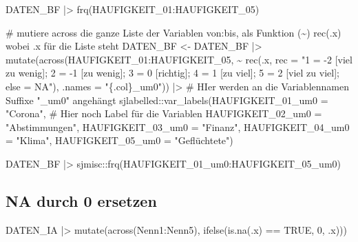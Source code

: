 \documentclass[twoside, pagesize, fontsize=11pt, dvipsnames]{scrreport}
\newenvironment{Shaded}{\begin{snugshade}}{\end{snugshade}}
\newcommand{\AttributeTok}[1]{\textcolor[rgb]{0.40,0.45,0.13}{#1}}
\newcommand{\CommentTok}[1]{\textcolor[rgb]{0.37,0.37,0.37}{#1}}
\newcommand{\ConstantTok}[1]{\textcolor[rgb]{0.56,0.35,0.01}{#1}}
\newcommand{\DecValTok}[1]{\textcolor[rgb]{0.68,0.00,0.00}{#1}}
\newcommand{\ErrorTok}[1]{\textcolor[rgb]{0.68,0.00,0.00}{#1}}
\newcommand{\FunctionTok}[1]{\textcolor[rgb]{0.28,0.35,0.67}{#1}}
\newcommand{\NormalTok}[1]{\textcolor[rgb]{0.00,0.23,0.31}{#1}}
\newcommand{\OtherTok}[1]{\textcolor[rgb]{0.00,0.23,0.31}{#1}}
\newcommand{\SpecialCharTok}[1]{\textcolor[rgb]{0.37,0.37,0.37}{#1}}
\newcommand{\StringTok}[1]{\textcolor[rgb]{0.13,0.47,0.30}{#1}}
\begin{document}
\begin{Shaded}
\begin{Highlighting}[]
\NormalTok{DATEN\_BF }\SpecialCharTok{|\textgreater{}} 
  \FunctionTok{frq}\NormalTok{(HAUFIGKEIT\_01}\SpecialCharTok{:}\NormalTok{HAUFIGKEIT\_05)}

\CommentTok{\# mutiere across die ganze Liste der Variablen von:bis, als Funktion (\textasciitilde{}) rec(.x) wobei .x für die Liste steht}
\NormalTok{DATEN\_BF }\OtherTok{\textless{}{-}}\NormalTok{ DATEN\_BF }\SpecialCharTok{|\textgreater{}} 
  \FunctionTok{mutate}\NormalTok{(}\FunctionTok{across}\NormalTok{(HAUFIGKEIT\_01}\SpecialCharTok{:}\NormalTok{HAUFIGKEIT\_05, }
                \SpecialCharTok{\textasciitilde{}} \FunctionTok{rec}\NormalTok{(.x, }\AttributeTok{rec =} \StringTok{"1 = {-}2 [viel zu wenig]; 2 = {-}1 [zu wenig]; 3 = 0 [richtig]; 4 = 1  [zu viel]; 5 = 2 [viel zu viel]; else = NA"}\NormalTok{), }
                       \AttributeTok{.names =} \StringTok{"\{.col\}\_um0"}\NormalTok{)) }\SpecialCharTok{|\textgreater{}} \CommentTok{\# HIer werden an die Variablennamen Suffixe "\_um0" angehängt}
\NormalTok{  sjlabelled}\SpecialCharTok{::}\FunctionTok{var\_labels}\NormalTok{(}\AttributeTok{HAUFIGKEIT\_01\_um0 =} \StringTok{"Corona"}\NormalTok{, }\CommentTok{\# Hier noch Label für die Variablen}
             \AttributeTok{HAUFIGKEIT\_02\_um0 =} \StringTok{"Abstimmungen"}\NormalTok{, }
             \AttributeTok{HAUFIGKEIT\_03\_um0 =} \StringTok{"Finanz"}\NormalTok{, }
             \AttributeTok{HAUFIGKEIT\_04\_um0 =} \StringTok{"Klima"}\NormalTok{, }
             \AttributeTok{HAUFIGKEIT\_05\_um0 =} \StringTok{"Geflüchtete"}\NormalTok{)}

\NormalTok{DATEN\_BF }\SpecialCharTok{|\textgreater{}} 
\NormalTok{  sjmisc}\SpecialCharTok{::}\FunctionTok{frq}\NormalTok{(HAUFIGKEIT\_01\_um0}\SpecialCharTok{:}\NormalTok{HAUFIGKEIT\_05\_um0)}
\end{Highlighting}
\end{Shaded}

\hypertarget{na-durch-0-ersetzen}{%
\subsection{NA durch 0 ersetzen}\label{na-durch-0-ersetzen}}

\begin{Shaded}
\begin{Highlighting}[]
\NormalTok{DATEN\_IA }\SpecialCharTok{|\textgreater{}} 
  \FunctionTok{mutate}\NormalTok{(}\FunctionTok{across}\NormalTok{(Nenn1}\SpecialCharTok{:}\NormalTok{Nenn5), }\FunctionTok{ifelse}\NormalTok{(}\FunctionTok{is.na}\NormalTok{(.x) }\SpecialCharTok{==} \ConstantTok{TRUE}\NormalTok{, }\DecValTok{0}\NormalTok{, .x))}\ErrorTok{)}
\end{Highlighting}
\end{Shaded}
\end{document}

